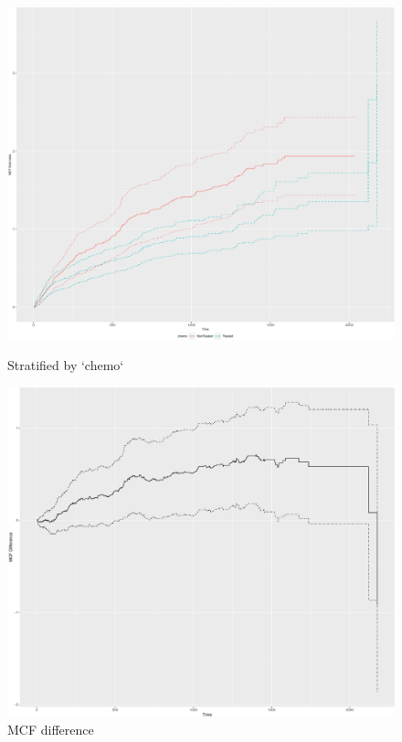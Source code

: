 \vspace*{-.3cm}\begin{figure}[H]
    \centering
    \begin{minipage}{0.245\textwidth}
        \centering
        \includegraphics[scale = .125]{images/plot-sampleMcf-1}
        \caption{Stratified by `chemo`}
    \end{minipage}\hfill
    \begin{minipage}{0.245\textwidth}
        \centering
        \includegraphics[scale = .125]{images/mcfdiffplot-1}
        \caption{MCF difference}
    \end{minipage}
\end{figure}

